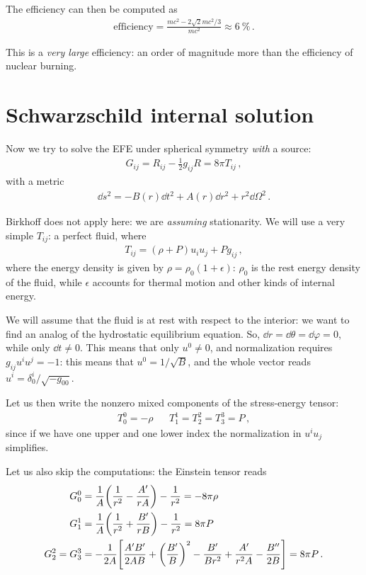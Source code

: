 \documentclass[main.tex]{subfiles}
\begin{document}
The efficiency can then be computed as 
%
\begin{align}
\text{efficiency} = \frac{mc^2 - 2 \sqrt{2} mc^2 / 3}{mc^2} \approx \SI{6}{\percent}
\,.
\end{align}

This is a \emph{very large} efficiency: an order of magnitude more than the efficiency of nuclear burning. 

\section{Schwarzschild internal solution}

Now we try to solve the EFE under spherical symmetry \emph{with} a source: 
%
\begin{align}
G_{ij} = R_{ij} - \frac{1}{2} g_{ij} R = 8 \pi T_{ij}
\,,
\end{align}
%
with a metric 
%
\begin{align}
\dd{s^2} = - B(r) \dd{t^2} + A(r) \dd{r^2} + r^2 \dd{\Omega^2}
\,.
\end{align}

Birkhoff does not apply here: we are \emph{assuming} stationarity.
We will use a very simple \(T_{ij}\): a perfect fluid, where 
%
\begin{align}
T_{ij} 
= (\rho + P) u_i u_j + P g_{ij} 
\,,
\end{align}
%
where the energy density is given by \(\rho = \rho_0 ( 1+ \epsilon )\): \(\rho_0\) is the rest energy density of the fluid, while \(\epsilon \) accounts for thermal motion and other kinds of internal energy.

We will assume that the fluid is at rest with respect to the interior: we want to find an analog of the hydrostatic equilibrium equation. 
So, \(\dd{r} = \dd{\theta } = \dd{\varphi } = 0\), while only \(\dd{t} \neq 0\). This means that only \(u^{0} \neq 0\), and normalization requires \(g_{ij} u^{i} u^{j} = -1\): this means that \(u^{0} =  1/ \sqrt{B}\), and the whole vector reads \(u^{i} = \delta^{i}_{0} / \sqrt{-g_{00} }\).

Let us then write the nonzero mixed components of the stress-energy tensor: 
%
\begin{align}
T^{0}_{0} = -\rho && 
T^{1}_{1} = T^{2}_{2} = T^{3}_{3} = P
\,,
\end{align}
%
since if we have one upper and one lower index the normalization in \(u^{i} u_{j}\) simplifies. 

Let us also skip the computations: the Einstein tensor reads 
%
\begin{align}
G^{0}_{0} &= \frac{1}{A} \qty( \frac{1}{r^2} - \frac{A'}{rA}) - \frac{1}{r^2} = - 8 \pi \rho   \\
G^{1}_{1} &= \frac{1}{A} \qty( \frac{1}{r^2} + \frac{B'}{rB}) - \frac{1}{r^2} = 8 \pi  P  \\
G^{2}_{2} = G^{3}_{3}  &= - \frac{1}{2A} \qty[\frac{A'B'}{2AB} + \qty(\frac{B'}{B})^2 - \frac{B'}{Br^2} + \frac{A'}{r^2A} - \frac{B''}{2B}] = 8 \pi P
\,.
\end{align}
\end{document}

